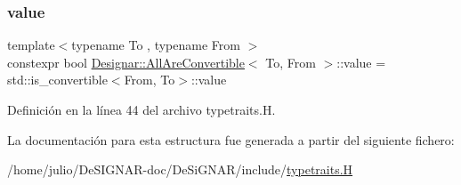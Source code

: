 \subsubsection{\texorpdfstring{value}{value}}
{\footnotesize\ttfamily template$<$typename To , typename From $>$ \\
constexpr bool \hyperlink{struct_designar_1_1_all_are_convertible}{Designar\+::\+All\+Are\+Convertible}$<$ To, From $>$\+::value = std\+::is\+\_\+convertible$<$From, To$>$\+::value\hspace{0.3cm}{\ttfamily [static]}}



Definición en la línea 44 del archivo typetraits.\+H.



La documentación para esta estructura fue generada a partir del siguiente fichero\+:\begin{DoxyCompactItemize}
\item 
/home/julio/\+De\+S\+I\+G\+N\+A\+R-\/doc/\+De\+Si\+G\+N\+A\+R/include/\hyperlink{typetraits_8_h}{typetraits.\+H}\end{DoxyCompactItemize}
